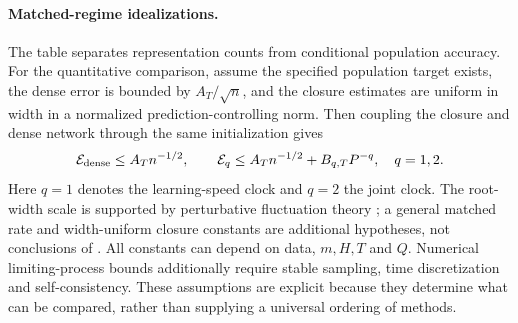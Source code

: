 \paragraph{Matched-regime idealizations.}
The table separates representation counts from conditional population accuracy.
For the quantitative comparison, assume the specified population target exists,
the dense error is bounded by $A_T/\sqrt n$, and the closure estimates are
uniform in width in a normalized prediction-controlling norm.  Then coupling
the closure and dense network through the same initialization gives
\begin{equation}
 \mathcal E_{\rm dense}\le A_Tn^{-1/2},\qquad
 \mathcal E_q\le A_Tn^{-1/2}+B_{q,T}P^{-q},\quad q=1,2.
 \label{eq:resource-laws}
\end{equation}
Here $q=1$ denotes the learning-speed clock and $q=2$ the joint clock.
The root-width scale is supported by perturbative fluctuation theory
\citep{bordelon2023finite}; a general matched rate and width-uniform closure
constants are additional hypotheses, not conclusions of
.  All constants can depend on data, $m,H,T$ and $Q$.
Numerical limiting-process bounds additionally require stable sampling,
time discretization and self-consistency.  These assumptions are explicit
because they determine what can be compared, rather than supplying a universal
ordering of methods.

